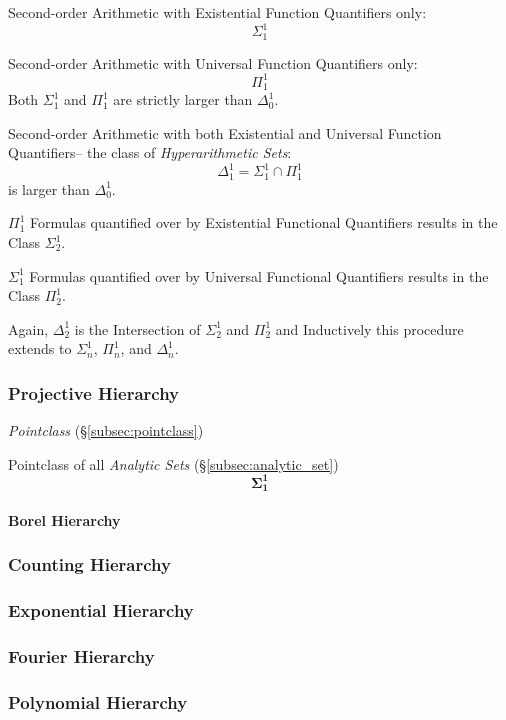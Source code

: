 \documentclass{article}
\begin{document}
Second-order Arithmetic with Existential Function Quantifiers only:
\[
    \Sigma^1_1
\]

Second-order Arithmetic with Universal Function Quantifiers only:
\[
    \Pi^1_1
\]
Both $\Sigma^1_1$ and $\Pi^1_1$ are strictly larger than $\Delta^1_0$.

Second-order Arithmetic with both Existential and Universal Function
Quantifiers-- the class of \emph{Hyperarithmetic Sets}:
\[
    \Delta^1_1 = \Sigma^1_1 \cap \Pi^1_1
\]
is larger than $\Delta^1_0$.

$\Pi^1_1$ Formulas quantified over by Existential Functional
Quantifiers results in the Class $\Sigma^1_2$.

$\Sigma^1_1$ Formulas quantified over by Universal Functional
Quantifiers results in the Class $\Pi^1_2$.

Again, $\Delta^1_2$ is the Intersection of $\Sigma^1_2$ and $\Pi^1_2$
and Inductively this procedure extends to $\Sigma^1_n$, $\Pi^1_n$, and
$\Delta^1_n$.



\subsubsection{Projective Hierarchy}\label{subsec:projective_hierarchy}

\emph{Pointclass} (\S\ref{subsec:pointclass})

Pointclass of all \emph{Analytic Sets} (\S\ref{subsec:analytic_set})
\[
    \mathbf{\Sigma^1_1}
\]

\paragraph{Borel Hierarchy}



\subsubsection{Counting Hierarchy}

\subsubsection{Exponential Hierarchy}

\subsubsection{Fourier Hierarchy}

\subsubsection{Polynomial Hierarchy}
\end{document}
